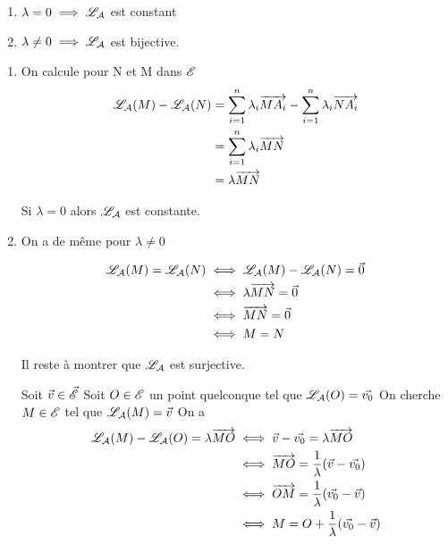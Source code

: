 \documentclass[a4paper,12pt]{article}
\begin{document}
\begin{theoreme}{}{}
    \begin{enumerate}
        \item $\lambda = 0 \implies \mathscr{L}_\mathcal{A}$ est constant
        \item $\lambda \neq 0 \implies \mathscr{L}_\mathcal{A}$ est bijective.
    \end{enumerate}
\end{theoreme}
\break
\begin{demonstration}
    \begin{enumerate}
        \item On calcule pour N et M dans $\mathscr{E}$
        \begin{align*}
            \mathscr{L}_\mathcal{A}(M) - \mathscr{L}_\mathcal{A}(N) &= \sum_{i=1}^n \lambda_i \overrightarrow{M A_i} - \sum_{i=1}^n \lambda_i \overrightarrow{N A_i} \\
            &= \sum_{i=1}^n \lambda_i \overrightarrow{MN} \\
            &= \lambda \overrightarrow{MN}
        \end{align*}

        Si $\lambda = 0$ alors $\mathscr{L}_\mathcal{A}$ est constante.

        \item On a de même pour $\lambda \neq 0$

        \begin{align*}
            \mathscr{L}_\mathcal{A}(M) = \mathscr{L}_\mathcal{A}(N) &\iff \mathscr{L}_\mathcal{A}(M) - \mathscr{L}_\mathcal{A}(N) = \vec{0} \\
            &\iff \lambda \overrightarrow{MN} = \vec{0} \\
            &\iff \overrightarrow{MN} = \vec{0} \\
            &\iff M = N
        \end{align*}

        Il reste à montrer que $\mathscr{L}_\mathcal{A}$ est surjective.

        Soit $\vec{v} \in \vec{\mathscr{E}}$
        Soit $O \in \mathscr{E}$ un point quelconque tel que $\mathscr{L}_\mathcal{A}(O) = \vec{v_0}$
        On cherche $M \in \mathscr{E}$ tel que $\mathscr{L}_\mathcal{A}(M) = \vec{v}$
        On a
        \begin{align*}
            \mathscr{L}_\mathcal{A}(M) - \mathscr{L}_\mathcal{A}(O) = \lambda \overrightarrow{MO} &\iff \vec{v} - \vec{v_0} = \lambda \overrightarrow{MO} \\
            &\iff \overrightarrow{MO} = \frac{1}{\lambda} (\vec{v} - \vec{v_0}) \\
            &\iff \overrightarrow{OM} = \frac{1}{\lambda} (\vec{v_0} - \vec{v}) \\
            &\iff M = O + \frac{1}{\lambda} (\vec{v_0} - \vec{v})
        \end{align*}
    \end{enumerate}
\end{demonstration}
\end{document}
